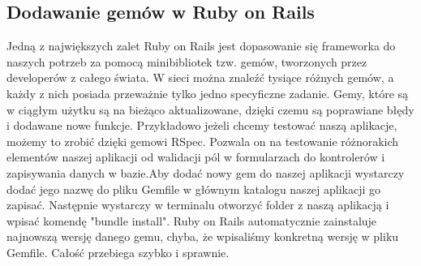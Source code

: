 \documentclass[brudnopis]{xmgr}
\begin{document}
\subsection{Dodawanie gemów w Ruby on Rails}
Jedną z największych zalet Ruby on Rails jest dopasowanie się frameworka do naszych potrzeb za pomocą minibibliotek tzw. gemów, tworzonych przez developerów z całego świata.
W sieci można znaleźć tysiące różnych gemów, a każdy z nich posiada przeważnie tylko jedno specyficzne zadanie. Gemy, które są w ciągłym użytku są na bieżąco aktualizowane, dzięki czemu są poprawiane błędy i dodawane nowe funkcje. Przykładowo jeżeli chcemy testować naszą aplikacje, możemy to zrobić dzięki gemowi RSpec. Pozwala on na testowanie różnorakich elementów naszej aplikacji od walidacji pól w formularzach do kontrolerów i zapisywania danych w bazie.\newline \indent Aby dodać nowy gem do naszej aplikacji wystarczy dodać jego nazwę do pliku Gemfile w głównym katalogu naszej aplikacji go zapisać. Następnie wystarczy w terminalu otworzyć folder z naszą aplikacją i wpisać komendę "bundle install". Ruby on Rails automatycznie zainstaluje najnowszą wersję danego gemu, chyba, że wpisaliśmy konkretną wersję w pliku Gemfile. Całość przebiega szybko i sprawnie.
\end{document}
